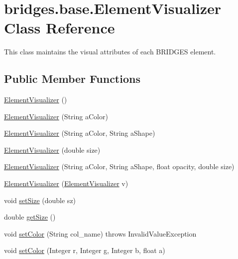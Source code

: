 \hypertarget{classbridges_1_1base_1_1_element_visualizer}{}\section{bridges.\+base.\+Element\+Visualizer Class Reference}
\label{classbridges_1_1base_1_1_element_visualizer}


This class maintains the visual attributes of each B\+R\+I\+D\+G\+ES element.  


\subsection*{Public Member Functions}
\begin{DoxyCompactItemize}
\item 
\hyperlink{classbridges_1_1base_1_1_element_visualizer_acbca874876ec1e8dbbde6484a4fc056e}{Element\+Visualizer} ()
\item 
\hyperlink{classbridges_1_1base_1_1_element_visualizer_a5c0d9fe8051ebc816372b9836689fdfa}{Element\+Visualizer} (String a\+Color)
\item 
\hyperlink{classbridges_1_1base_1_1_element_visualizer_ab62b1b06907fbeddfcee2b4b297e1021}{Element\+Visualizer} (String a\+Color, String a\+Shape)
\item 
\hyperlink{classbridges_1_1base_1_1_element_visualizer_ab32f66b72ccf0a26c03ba44006da9ac6}{Element\+Visualizer} (double size)
\item 
\hyperlink{classbridges_1_1base_1_1_element_visualizer_a9bf06ca1b6c215e079ab33ccd99633e8}{Element\+Visualizer} (String a\+Color, String a\+Shape, float opacity, double size)
\item 
\hyperlink{classbridges_1_1base_1_1_element_visualizer_a5b48cbda94a4e84e40de41fe156e2497}{Element\+Visualizer} (\hyperlink{classbridges_1_1base_1_1_element_visualizer}{Element\+Visualizer} v)
\item 
void \hyperlink{classbridges_1_1base_1_1_element_visualizer_aba410184f7df495594fc1fa7948335a5}{set\+Size} (double sz)
\item 
double \hyperlink{classbridges_1_1base_1_1_element_visualizer_a0b7673bf724e3df1f94df50ad95ca5b1}{get\+Size} ()
\item 
void \hyperlink{classbridges_1_1base_1_1_element_visualizer_ad7ff2a772741301c08943a58ffccca38}{set\+Color} (String col\+\_\+name)  throws Invalid\+Value\+Exception
\item 
void \hyperlink{classbridges_1_1base_1_1_element_visualizer_a84fad1c8abe43b20c68c1800d7630918}{set\+Color} (Integer r, Integer g, Integer b, float a)

\end{DoxyCompactItemize}
